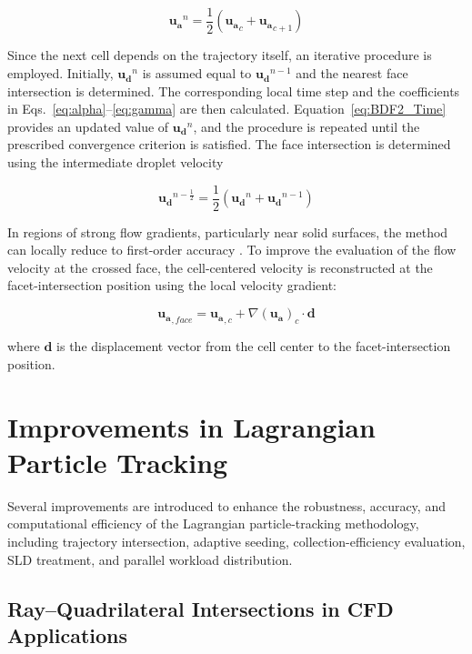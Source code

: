 \begin{equation}
    \boldsymbol{u_a}^n = \frac{1}{2} (\boldsymbol{u_a}_c + \boldsymbol{u_a}_{c+1})
\end{equation}

\noindent Since the next cell depends on the trajectory itself, an iterative procedure is employed. Initially, $\boldsymbol{u_d}^n$ is assumed equal to $\boldsymbol{u_d}^{n-1}$ and the nearest face intersection is determined. The corresponding local time step and the coefficients in Eqs.~\ref{eq:alpha}--\ref{eq:gamma} are then calculated. Equation~\ref{eq:BDF2_Time} provides an updated value of $\boldsymbol{u_d}^n$, and the procedure is repeated until the prescribed convergence criterion is satisfied. The face intersection is determined using the intermediate droplet velocity

\begin{equation}
    \boldsymbol{u_d}^{n-\frac{1}{2}} = \frac{1}{2} (\boldsymbol{u_d}^n + \boldsymbol{u_d}^{n-1})
\end{equation}

\noindent In regions of strong flow gradients, particularly near solid surfaces, the method can locally reduce to first-order accuracy \cite{rendall2014finite}. To improve the evaluation of the flow velocity at the crossed face, the cell-centered velocity is reconstructed at the facet-intersection position using the local velocity gradient:

\begin{equation}
\boldsymbol{u_a}_{,face} = \boldsymbol{u_a}_{,c} + \nabla(\boldsymbol{u_a})_{c} \cdot \boldsymbol{d}
\label{eq:faceFlow}
\end{equation}

\noindent where $\boldsymbol{d}$ is the displacement vector from the cell center to the facet-intersection position.

\section{Improvements in Lagrangian Particle Tracking}
\label{sec:solverEnhacements}
Several improvements are introduced to enhance the robustness, accuracy, and computational efficiency of the Lagrangian particle-tracking methodology, including trajectory intersection, adaptive seeding, collection-efficiency evaluation, SLD treatment, and parallel workload distribution.
\subsection{Ray--Quadrilateral Intersections in CFD Applications}
\label{subsec:ray_quad_cfd}

